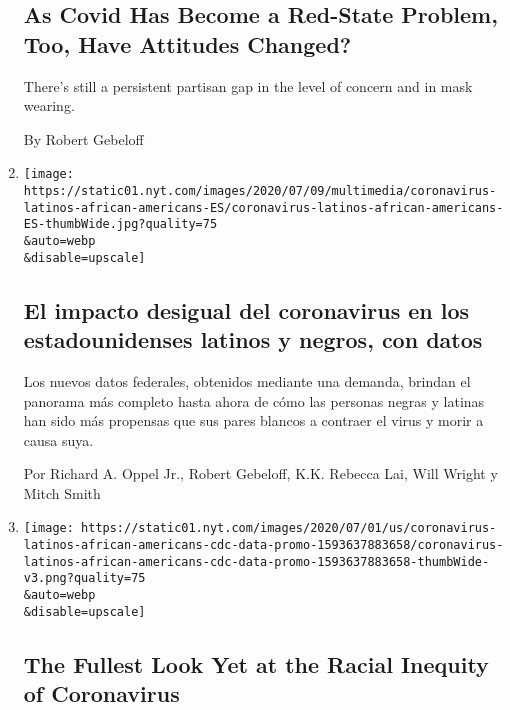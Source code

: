 \begin{enumerate}
  \hypertarget{as-covid-has-become-a-red-state-problem-too-have-attitudes-changed}{%
  \subsection{As Covid Has Become a Red-State Problem, Too, Have
  Attitudes
  Changed?}\label{as-covid-has-become-a-red-state-problem-too-have-attitudes-changed}}

  There's still a persistent partisan gap in the level of concern and in
  mask wearing.

  By Robert Gebeloff
\item
  \href{/es/interactive/2020/07/09/espanol/mundo/coronavirus-latinos-africanoamericanos-datos.html}{}

  \texttt{[image: https://static01.nyt.com/images/2020/07/09/multimedia/coronavirus-latinos-african-americans-ES/coronavirus-latinos-african-americans-ES-thumbWide.jpg?quality=75\\\&auto=webp\\\&disable=upscale]}

  \hypertarget{el-impacto-desigual-del-coronavirus-en-los-estadounidenses-latinos-y-negros-con-datos}{%
  \subsection{El impacto desigual del coronavirus en los estadounidenses
  latinos y negros, con
  datos}\label{el-impacto-desigual-del-coronavirus-en-los-estadounidenses-latinos-y-negros-con-datos}}

  Los nuevos datos federales, obtenidos mediante una demanda, brindan el
  panorama más completo hasta ahora de cómo las personas negras y
  latinas han sido más propensas que sus pares blancos a contraer el
  virus y morir a causa suya.

  Por Richard A. Oppel Jr., Robert Gebeloff, K.K. Rebecca Lai, Will
  Wright y Mitch Smith
\item
  \href{/interactive/2020/07/05/us/coronavirus-latinos-african-americans-cdc-data.html}{}

  \texttt{[image: https://static01.nyt.com/images/2020/07/01/us/coronavirus-latinos-african-americans-cdc-data-promo-1593637883658/coronavirus-latinos-african-americans-cdc-data-promo-1593637883658-thumbWide-v3.png?quality=75\\\&auto=webp\\\&disable=upscale]}

  \hypertarget{the-fullest-look-yet-at-the-racial-inequity-of-coronavirus}{%
  \subsection{The Fullest Look Yet at the Racial Inequity of
  Coronavirus}\label{the-fullest-look-yet-at-the-racial-inequity-of-coronavirus}}


\end{enumerate}
